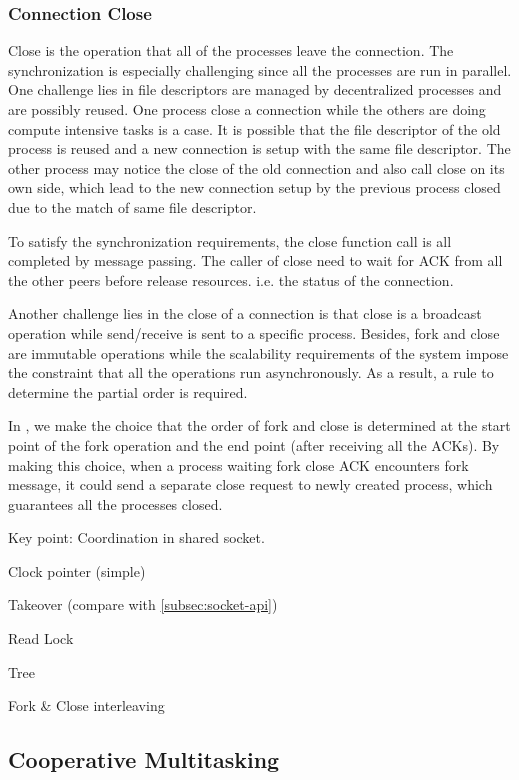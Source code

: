 \subsubsection{Connection Close}
\label{subsubsec:fork_close}

Close is the operation that all of the processes leave the connection. The synchronization is  especially challenging since all the processes are run in parallel. One challenge lies in file descriptors are managed by decentralized processes and are possibly reused. One process close a connection while the others are doing compute intensive tasks is a case. It is possible that the file descriptor of the old process is reused and a new connection is setup with the same file descriptor. The other process may notice the close of the old connection and also call close on its own side, which lead to the new connection setup by the previous process closed due to the match of same file descriptor. 

To satisfy the synchronization requirements, the close function call is all completed by message passing. The caller of close need to wait for ACK from all the other peers before release resources. i.e. the status of the connection.

Another challenge lies in the close of a connection is that close is a broadcast operation while send/receive is sent to a specific process. Besides, fork and close are immutable operations while the scalability requirements of the system impose the constraint that all the operations run asynchronously. As a result, a rule to determine the partial order is required.

In \libipc, we make the choice that the order of fork and close is determined at the start point of the fork operation and the end point (after receiving all the ACKs). By making this choice, when a process waiting fork close ACK encounters fork message, it could send a separate close request to newly created process, which guarantees all the processes closed.
  
Key point: Coordination in shared socket.

Clock pointer (simple)

Takeover (compare with \ref{subsec:socket-api})

Read Lock

Tree

Fork \& Close interleaving

\subsection{Cooperative Multitasking}
\label{subsec:process-mux}

